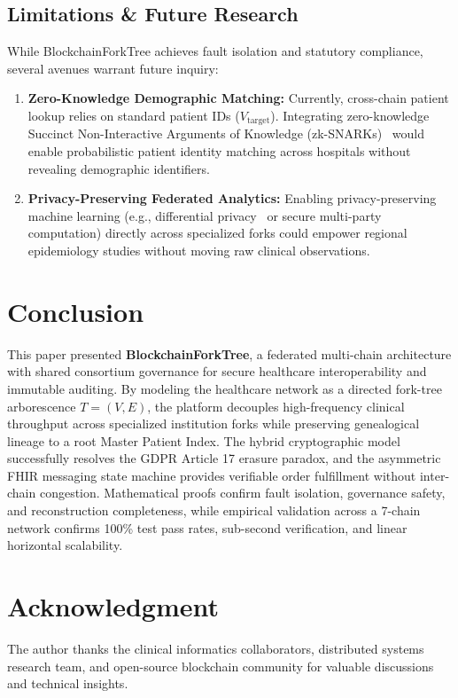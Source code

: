 \documentclass[journal]{IEEEtran}
\theoremstyle{definition}
\begin{document}
\subsection{Limitations \& Future Research}
While BlockchainForkTree achieves fault isolation and statutory compliance, several avenues warrant future inquiry:
\begin{enumerate}
    \item \textbf{Zero-Knowledge Demographic Matching:} Currently, cross-chain patient lookup relies on standard patient IDs ($V_{\text{target}}$). Integrating zero-knowledge Succinct Non-Interactive Arguments of Knowledge (zk-SNARKs)~\cite{sasson2014zerocash} would enable probabilistic patient identity matching across hospitals without revealing demographic identifiers.
    \item \textbf{Privacy-Preserving Federated Analytics:} Enabling privacy-preserving machine learning (e.g., differential privacy~\cite{choudhury2020framework} or secure multi-party computation) directly across specialized forks could empower regional epidemiology studies without moving raw clinical observations.
\end{enumerate}

\section{Conclusion}
This paper presented \textbf{BlockchainForkTree}, a federated multi-chain architecture with shared consortium governance for secure healthcare interoperability and immutable auditing. By modeling the healthcare network as a directed fork-tree arborescence $T = (V,E)$, the platform decouples high-frequency clinical throughput across specialized institution forks while preserving genealogical lineage to a root Master Patient Index. The hybrid cryptographic model successfully resolves the GDPR Article 17 erasure paradox, and the asymmetric FHIR messaging state machine provides verifiable order fulfillment without inter-chain congestion. Mathematical proofs confirm fault isolation, governance safety, and reconstruction completeness, while empirical validation across a 7-chain network confirms 100\% test pass rates, sub-second verification, and linear horizontal scalability.

\section*{Acknowledgment}
The author thanks the clinical informatics collaborators, distributed systems research team, and open-source blockchain community for valuable discussions and technical insights.



\end{document}
